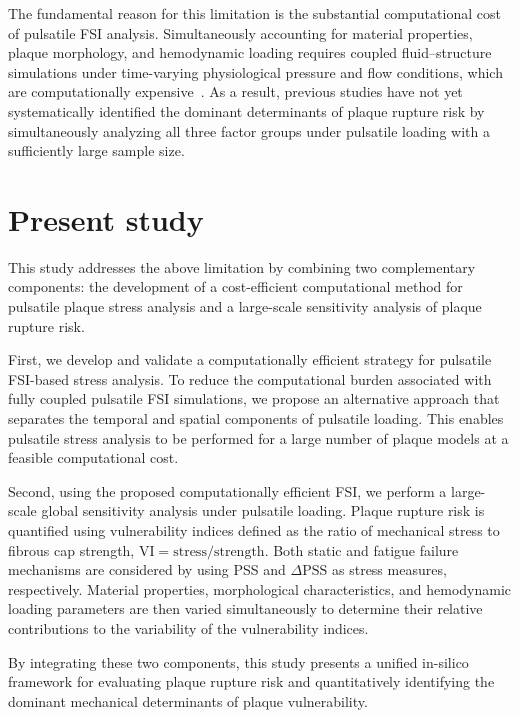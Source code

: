 \documentclass[master,english,final]{kaist-ucs}
\begin{document}
The fundamental reason for this limitation is the substantial computational cost of pulsatile FSI analysis. Simultaneously accounting for material properties, plaque morphology, and hemodynamic loading requires coupled fluid--structure simulations under time-varying physiological pressure and flow conditions, which are computationally expensive~\cite{wang2021_multipatient, lissoni2025_coronary_methods}. As a result, previous studies have not yet systematically identified the dominant determinants of plaque rupture risk by simultaneously analyzing all three factor groups under pulsatile loading with a sufficiently large sample size.

\section{Present study}
This study addresses the above limitation by combining two complementary components: the development of a cost-efficient computational method for pulsatile plaque stress analysis and a large-scale sensitivity analysis of plaque rupture risk.

First, we develop and validate a computationally efficient strategy for pulsatile FSI-based stress analysis. To reduce the computational burden associated with fully coupled pulsatile FSI simulations, we propose an alternative approach that separates the temporal and spatial components of pulsatile loading. This enables pulsatile stress analysis to be performed for a large number of plaque models at a feasible computational cost.

Second, using the proposed computationally efficient FSI, we perform a large-scale global sensitivity analysis under pulsatile loading. Plaque rupture risk is quantified using vulnerability indices defined as the ratio of mechanical stress to fibrous cap strength, $\mathrm{VI} = \mathrm{stress}/\mathrm{strength}$. Both static and fatigue failure mechanisms are considered by using PSS and $\Delta\mathrm{PSS}$ as stress measures, respectively. Material properties, morphological characteristics, and hemodynamic loading parameters are then varied simultaneously to determine their relative contributions to the variability of the vulnerability indices.

By integrating these two components, this study presents a unified in-silico framework for evaluating plaque rupture risk and quantitatively identifying the dominant mechanical determinants of plaque vulnerability.


\end{document}
